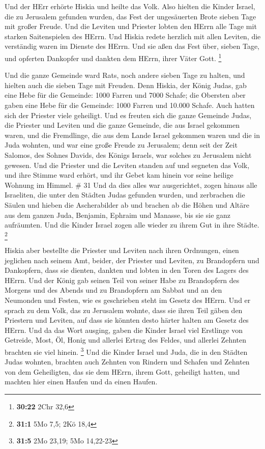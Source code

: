  Und der HErr erhörte Hiskia und heilte das Volk.
 Also hielten die Kinder Israel, die zu Jerusalem gefunden
wurden, das Fest der ungesäuerten Brote sieben Tage mit großer Freude.
Und die Leviten und Priester lobten den HErrn alle Tage mit starken
Saitenspielen des HErrn.  Und Hiskia redete herzlich mit
allen Leviten, die verständig waren im Dienste des HErrn. Und sie aßen
das Fest über, sieben Tage, und opferten Dankopfer und dankten dem
HErrn, ihrer Väter Gott. \footnote{\textbf{30:22} 2Chr 32,6}

 Und die ganze Gemeinde ward Rats, noch andere sieben Tage
zu halten, und hielten auch die sieben Tage mit Freuden. 
Denn Hiskia, der König Judas, gab eine Hebe für die Gemeinde: 1000
Farren und 7000 Schafe; die Obersten aber gaben eine Hebe für die
Gemeinde: 1000 Farren und 10.000 Schafe. Auch hatten sich der Priester
viele geheiligt.  Und es freuten sich die ganze Gemeinde
Judas, die Priester und Leviten und die ganze Gemeinde, die aus Israel
gekommen waren, und die Fremdlinge, die aus dem Lande Israel gekommen
waren und die in Juda wohnten,  und war eine große Freude
zu Jerusalem; denn seit der Zeit Salomos, des Sohnes Davids, des Königs
Israels, war solches zu Jerusalem nicht gewesen.  Und die
Priester und die Leviten standen auf und segneten das Volk, und ihre
Stimme ward erhört, und ihr Gebet kam hinein vor seine heilige Wohnung
im Himmel. \# 31  Und da dies alles war ausgerichtet, zogen
hinaus alle Israeliten, die unter den Städten Judas gefunden wurden, und
zerbrachen die Säulen und hieben die Ascherabilder ab und brachen ab die
Höhen und Altäre aus dem ganzen Juda, Benjamin, Ephraim und Manasse, bis
sie sie ganz aufräumten. Und die Kinder Israel zogen alle wieder zu
ihrem Gut in ihre Städte. \footnote{\textbf{31:1} 5Mo 7,5; 2Kö 18,4}

 Hiskia aber bestellte die Priester und Leviten nach ihren
Ordnungen, einen jeglichen nach seinem Amt, beider, der Priester und
Leviten, zu Brandopfern und Dankopfern, dass sie dienten, dankten und
lobten in den Toren des Lagers des HErrn.  Und der König gab
seinen Teil von seiner Habe zu Brandopfern des Morgens und des Abends
und zu Brandopfern am Sabbat und an den Neumonden und Festen, wie es
geschrieben steht im Gesetz des HErrn.  Und er sprach zu dem
Volk, das zu Jerusalem wohnte, dass sie ihren Teil gäben den Priestern
und Leviten, auf dass sie könnten desto härter halten am Gesetz des
HErrn.  Und da das Wort ausging, gaben die Kinder Israel
viel Erstlinge von Getreide, Most, Öl, Honig und allerlei Ertrag des
Feldes, und allerlei Zehnten brachten sie viel hinein. \footnote{\textbf{31:5}
  2Mo 23,19; 5Mo 14,22-23}  Und die Kinder Israel und Juda,
die in den Städten Judas wohnten, brachten auch Zehnten von Rindern und
Schafen und Zehnten von dem Geheiligten, das sie dem HErrn, ihrem Gott,
geheiligt hatten, und machten hier einen Haufen und da einen Haufen.

